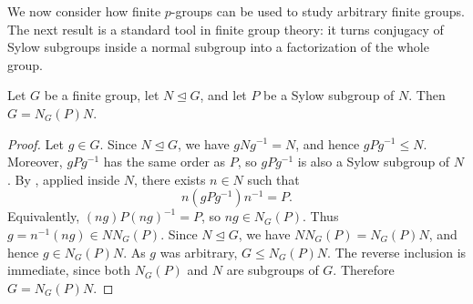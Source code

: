 \documentclass[../Odyssey_Project.tex]{subfiles}
\begin{document}
We now consider how finite $p$-groups can be used to study arbitrary finite groups. The next result is a standard tool in finite group theory: it turns conjugacy of Sylow subgroups inside a normal subgroup into a factorization of the whole group.

\begin{namedtheorem}
\label{thm:frattini-arg}
Let $G$ be a finite group, let $N \trianglelefteq G$, and let $P$ be a Sylow subgroup of $N$. Then $G = N_G(P)N$.
\end{namedtheorem}
\begin{proof}
Let $g\in G$. Since $N\trianglelefteq G$, we have $gNg^{-1}=N$, and hence $gPg^{-1}\leq N$. Moreover, $gPg^{-1}$ has the same order as $P$, so $gPg^{-1}$ is also a Sylow subgroup of $N$. By , applied inside $N$, there exists $n\in N$ such that
\[
    n(gPg^{-1})n^{-1}=P.
\]
Equivalently, $(ng)P(ng)^{-1}=P$, so $ng\in N_G(P)$. Thus $g=n^{-1}(ng)\in NN_G(P)$. Since $N\trianglelefteq G$, we have $NN_G(P)=N_G(P)N$, and hence $g\in N_G(P)N$. As $g$ was arbitrary, $G\leq N_G(P)N$. The reverse inclusion is immediate, since both $N_G(P)$ and $N$ are subgroups of $G$. Therefore $G=N_G(P)N$.
\end{proof}
\end{document}
